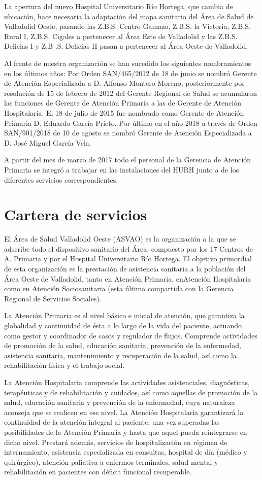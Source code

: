La apertura del nuevo Hospital Universitario Río Hortega, que cambia de ubicación, hace necesaria la adaptación del mapa sanitario del Área de Salud de Valladolid Oeste, pasando las Z.B.S. Centro Gamazo, Z.B.S. la Victoria, Z.B.S. Rural I, Z.B.S. Cigales a pertenecer al Área Este de Valladolid y las Z.B.S. Delicias I y Z.B .S. Delicias II pasan a pertenecer al Área Oeste de Valladolid.

Al frente de nuestra organización se han sucedido los siguientes nombramientos en los últimos años: Por Orden SAN/465/2012 de 18 de junio se nombró Gerente de Atención Especializada a D. Alfonso Montero Moreno, posteriormente por resolución de 15 de febrero de 2012 del Gerente Regional de Salud se acumularon las funciones de Gerente de Atención Primaria a las de Gerente de Atención Hospitalaria. El 18 de julio de 2015 fue nombrado como Gerente de Atención Primaria D. Eduardo García Prieto. Por último en el año 2018 a través de Orden SAN/901/2018 de 10 de agosto se nombró Gerente de Atención Especializada a D. José Miguel García Vela.

A partir del mes de marzo de 2017 todo el personal de la Gerencia de Atención Primaria se integró a trabajar en las instalaciones del HURH junto a de los diferentes servicios correspondientes.

\section{Cartera de servicios}

El Área de Salud Valladolid Oeste (ASVAO) es la organización a la que se adscribe todo el dispositivo sanitario del Área, compuesto por los 17 Centros de A. Primaria y por el Hospital Universitario Río Hortega. El objetivo primordial de esta organización es la prestación de asistencia sanitaria a la población del Área Oeste de Valladolid, tanto en Atención Primaria, enAtención Hospitalaria como en Atención Sociosanitaria (esta última compartida con la Gerencia Regional de Servicios Sociales).

La Atención Primaria es el nivel básico e inicial de atención, que garantiza la globalidad y continuidad de ésta a lo largo de la vida del paciente, actuando como gestor y coordinador de casos y regulador de flujos. Comprende actividades de promoción de la salud, educación sanitaria, prevención de la enfermedad, asistencia sanitaria, mantenimiento y recuperación de la salud, así como la rehabilitación física y el trabajo social.

La Atención Hospitalaria comprende las actividades asistenciales, diagnósticas, terapéuticas y de rehabilitación y cuidados, así como aquellas de promoción de la salud, educación sanitaria y prevención de la enfermedad, cuya naturaleza aconseja que se realicen en ese nivel. La Atención Hospitalaria garantizará la continuidad de la atención integral al paciente, una vez superadas las posibilidades de la Atención Primaria y hasta que aquel pueda reintegrarse en dicho nivel. Prestará además, servicios de hospitalización en régimen de internamiento, asistencia especializada en consultas, hospital de día (médico y quirúrgico), atención paliativa a enfermos terminales, salud mental y rehabilitación en pacientes con déficit funcional recuperable.

